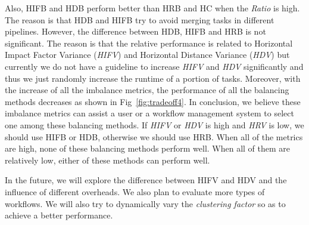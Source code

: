 Also, HIFB and HDB perform better than HRB and HC when the {\em Ratio} is high. The reason is that HDB and HIFB try to avoid merging tasks in different pipelines. However, the difference between HDB, HIFB and HRB is not significant. The reason is that the relative performance is related to Horizontal Impact Factor Variance ({\em HIFV}) and Horizontal Distance Variance ({\em HDV}) but currently we do not have a guideline to increase {\em HIFV} and {\em HDV} significantly and thus we just randomly increase the runtime of a portion of tasks. Moreover, with the increase of all the imbalance metrics, the performance of all the balancing methods decreases as shown in Fig~\ref{fig:tradeoff4}. In conclusion, we believe these imbalance metrics can assist a user or a workflow management system to select one among these balancing methods. If {\em HIFV} or {\em HDV} is high and {\em HRV} is low, we should use HIFB or HDB, otherwise we should use HRB. When all of the metrics are high, none of these balancing methods perform well. When all of them are relatively low, either of these methods can perform well. 




In the future, we will explore the difference between HIFV and HDV and the influence of different overheads. We also plan to evaluate more types of workflows. We will also try to dynamically vary the {\em clustering factor} so as to achieve a better performance.


